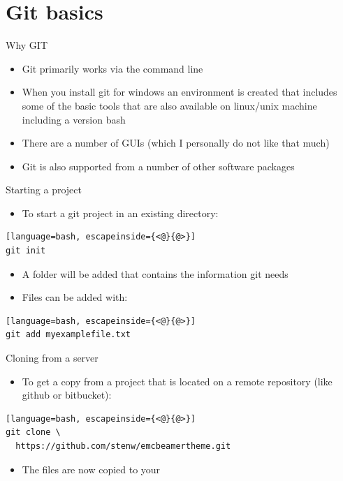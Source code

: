 \documentclass[12pt]{beamer}
\begin{document}
\section{Git basics}

\begin{frame}{Why GIT}
	\begin{itemize}	
      \item Git primarily works via the command line
      \item When you install git for windows an environment is created that includes some of the basic tools that are also available on linux/unix machine including a version \alert{bash}
      \item There are a number of GUIs (which I personally do not like that much)
      \item Git is also supported from a number of other software packages 
	\end{itemize}
\end{frame}



\begin{frame}[fragile]{Starting a project}
\begin{itemize}
\item To start a git project in an existing directory:
\end{itemize}
\begin{lstlisting}[language=bash, escapeinside={<@}{@>}]
git init
\end{lstlisting}
\begin{itemize}
	\item A  folder will be added that contains the information git needs
\end{itemize}
\begin{itemize}
\item Files can be added with:
\end{itemize}
\begin{lstlisting}[language=bash, escapeinside={<@}{@>}]
git add myexamplefile.txt
\end{lstlisting}
\end{frame}

\begin{frame}[fragile]{Cloning from a server}
\begin{itemize}
\item To get a copy from a project that is located on a remote repository (like github or bitbucket):
\end{itemize}
\begin{lstlisting}[language=bash, escapeinside={<@}{@>}]
git clone \
  https://github.com/stenw/emcbeamertheme.git
\end{lstlisting}
\begin{itemize}
\item The files are now copied to your \textbf{}
\end{itemize}
\end{frame}
\end{document}
